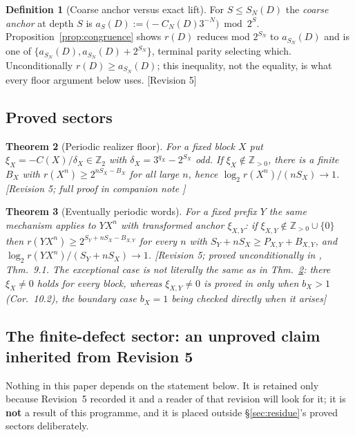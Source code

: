 \documentclass[11pt]{article}
\theoremstyle{plain}
\newtheorem{theorem}{Theorem}[section]
\theoremstyle{definition}
\newtheorem{definition}[theorem]{Definition}
\theoremstyle{remark}
\newcommand{\Zt}{\mathbb{Z}_2}
\newcommand{\Zpos}{\mathbb{Z}_{>0}}
\newcommand{\status}[1]{\textsf{\footnotesize[#1]}}
\begin{document}
\begin{definition}[Coarse anchor versus exact lift]
For $S\le S_N(D)$ the \emph{coarse anchor} at depth $S$ is
$a_S(D):=\bigl(-C_N(D)3^{-N}\bigr)\bmod 2^S$. Proposition~\ref{prop:congruence} shows $r(D)$
reduces mod $2^{S_N}$ to $a_{S_N}(D)$ and is one of $\{a_{S_N}(D),a_{S_N}(D)+2^{S_N}\}$, terminal
parity selecting which. Unconditionally $r(D)\ge a_{S_N}(D)$; this inequality, not the equality, is
what every floor argument below uses. \status{Revision 5}
\end{definition}

\subsection{Proved sectors}

\begin{theorem}[Periodic realizer floor]\label{thm:periodic}
For a fixed block $X$ put $\xi_X=-C(X)/\delta_X\in\Zt$ with $\delta_X=3^{q_X}-2^{S_X}$ odd. If
$\xi_X\notin\Zpos$, there is a finite $B_X$ with
$r(X^n)\ge 2^{nS_X-B_X}$ for all large $n$, hence $\log_2 r(X^n)/(nS_X)\to1$. \status{Revision 5;
full proof in companion note \cite{DJperiodic}}
\end{theorem}

\begin{theorem}[Eventually periodic words]\label{thm:evperiodic}
For a fixed prefix $Y$ the same mechanism applies to $YX^n$ with transformed anchor $\xi_{X,Y}$:
if $\xi_{X,Y}\notin\Zpos\cup\{0\}$ then
$r(YX^n)\ge2^{S_Y+nS_X-B_{X,Y}}$ \emph{for every $n$ with $S_Y+nS_X\ge P_{X,Y}+B_{X,Y}$}, and
$\log_2 r(YX^n)/(S_Y+nS_X)\to1$.
\status{Revision 5; proved unconditionally in \cite{DJperiodic}, Thm.~9.1. The exceptional case is
\emph{not} literally the same as in Thm.~\ref{thm:periodic}: there $\xi_X\ne0$ holds for every
block, whereas $\xi_{X,Y}\ne0$ is proved in \cite{DJperiodic} only when $b_X>1$ (Cor.~10.2), the
boundary case $b_X=1$ being checked directly when it arises}
\end{theorem}

\subsection{The finite-defect sector: an unproved claim inherited from Revision 5}
\label{sec:bulkdefect}

Nothing in this paper depends on the statement below. It is retained only because Revision~5
recorded it and a reader of that revision will look for it; it is \textbf{not} a result of this
programme, and it is placed outside \S\ref{sec:residue}'s proved sectors deliberately.
\end{document}
